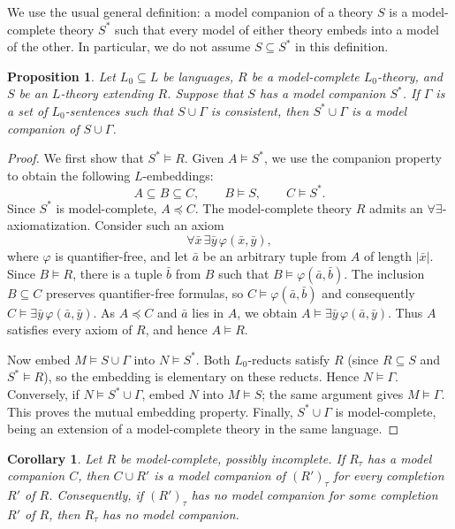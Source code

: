 \documentclass[10pt,a4paper]{amsart}
\newtheorem{proposition}[theorem]{Proposition}
\newtheorem{corollary}[theorem]{Corollary}
\theoremstyle{definition}
\begin{document}
We use the usual general definition: a model companion of a theory $S$ is a
model-complete theory $S^*$ such that every model of either theory
embeds into a model of the other. In particular, we do not assume
$S\subseteq S^*$ in this definition.

\begin{proposition}\label{mc:prop:transfer}
Let $L_0\subseteq L$ be languages, $R$ be a model-complete $L_0$-theory,
and $S$ be an $L$-theory extending $R$. Suppose that $S$ has
a model companion $S^*$. If $\Gamma$ is a set of $L_0$-sentences
such that $S\cup\Gamma$ is consistent, then $S^*\cup\Gamma$ is
a model companion of $S\cup\Gamma$.
\end{proposition}

\begin{proof}
We first show that $S^*\models R$. Given $A\models S^*$, we use the
companion property to obtain the following $L$-embeddings:
\[
  A\subseteq B\subseteq C,
  \qquad B\models S,\qquad C\models S^*.
\]
Since $S^*$ is model-complete, $A\preccurlyeq C$. The
model-complete theory $R$ admits an $\forall\exists$-axiomatization.
Consider such an axiom
\[
\forall\bar x\,\exists\bar y\,\varphi(\bar x,\bar y),
\]
where $\varphi$ is quantifier-free, and let $\bar a$ be an arbitrary tuple
from $A$ of length $|\bar x|$. Since $B\models R$, there is a tuple $\bar b$ from $B$
such that $B\models\varphi(\bar a,\bar b)$. The inclusion $B\subseteq C$ preserves quantifier-free formulas,
so $C\models\varphi(\bar a,\bar b)$ 
and consequently $C\models\exists\bar y\,\varphi(\bar a,\bar y)$.
As $A\preccurlyeq C$ and $\bar a$ lies in $A$, we obtain
$A\models\exists\bar y\,\varphi(\bar a,\bar y)$. Thus $A$ satisfies every axiom of $R$, and hence $A\models R$.

Now embed $M\models S\cup\Gamma$ into $N\models S^*$. Both
$L_0$-reducts satisfy $R$ (since $R\subseteq S$ and $S^*\models R$), so the embedding is elementary on these
reducts. Hence $N\models\Gamma$. Conversely, if
$N\models S^*\cup\Gamma$, embed $N$ into $M\models S$; the
same argument gives $M\models\Gamma$. This proves the mutual
embedding property. Finally, $S^*\cup\Gamma$ is model-complete,
being an extension of a model-complete theory in the same language.
\end{proof}

\begin{corollary}\label{mc:cor:completions}
Let $R$ be model-complete, possibly incomplete. If $R_\tau$ has
a model companion $C$, then $C\cup R'$ is a model companion of
$(R')_\tau$ for every completion $R'$ of $R$. Consequently, if
$(R')_\tau$ has no model companion for some completion $R'$ of
$R$, then $R_\tau$ has no model companion.
\end{corollary}
\end{document}

